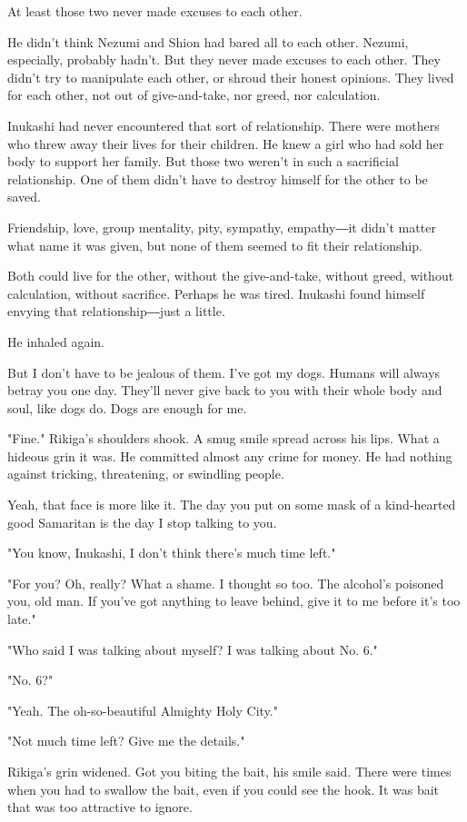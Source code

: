At least those two never made excuses to each other.

He didn't think Nezumi and Shion had bared all to each other. Nezumi,
especially, probably hadn't. But they never made excuses to each other.
They didn't try to manipulate each other, or shroud their honest
opinions. They lived for each other, not out of give-and-take, nor
greed, nor calculation.

Inukashi had never encountered that sort of relationship. There were
mothers who threw away their lives for their children. He knew a girl
who had sold her body to support her family. But those two weren't in
such a sacrificial relationship. One of them didn't have to destroy
himself for the other to be saved.

Friendship, love, group mentality, pity, sympathy, empathy―it didn't
matter what name it was given, but none of them seemed to fit their
relationship.

Both could live for the other, without the give-and-take, without greed,
without calculation, without sacrifice. Perhaps he was tired. Inukashi
found himself envying that relationship―just a little.

He inhaled again.

But I don't have to be jealous of them. I've got my dogs. Humans will
always betray you one day. They'll never give back to you with their
whole body and soul, like dogs do. Dogs are enough for me.

"Fine." Rikiga's shoulders shook. A smug smile spread across his lips.
What a hideous grin it was. He committed almost any crime for money. He
had nothing against tricking, threatening, or swindling people.

Yeah, that face is more like it. The day you put on some mask of a
kind-hearted good Samaritan is the day I stop talking to you.

"You know, Inukashi, I don't think there's much time left."

"For you? Oh, really? What a shame. I thought so too. The alcohol's
poisoned you, old man. If you've got anything to leave behind, give it
to me before it's too late."

"Who said I was talking about myself? I was talking about No. 6."

"No. 6?"

"Yeah. The oh-so-beautiful Almighty Holy City."

"Not much time left? Give me the details."

Rikiga's grin widened. Got you biting the bait, his smile said. There
were times when you had to swallow the bait, even if you could see the
hook. It was bait that was too attractive to ignore.


